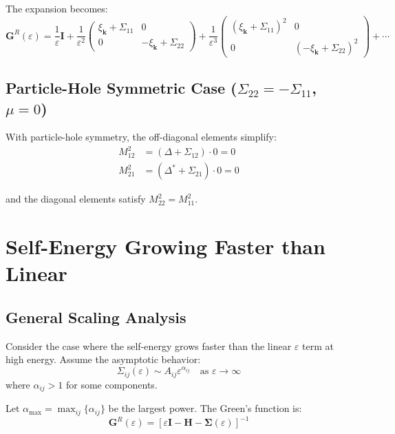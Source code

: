 \documentclass[12pt]{article}
\begin{document}
The expansion becomes:
\begin{equation}
\mathbf{G}^R(\varepsilon) = \frac{1}{\varepsilon}\mathbf{I} + \frac{1}{\varepsilon^2}\begin{pmatrix}
\xi_{\mathbf{k}} + \Sigma_{11} & 0 \\
0 & -\xi_{\mathbf{k}} + \Sigma_{22}
\end{pmatrix} + \frac{1}{\varepsilon^3}\begin{pmatrix}
(\xi_{\mathbf{k}} + \Sigma_{11})^2 & 0 \\
0 & (-\xi_{\mathbf{k}} + \Sigma_{22})^2
\end{pmatrix} + \cdots
\end{equation}

\subsection{Particle-Hole Symmetric Case ($\Sigma_{22} = -\Sigma_{11}$, $\mu = 0$)}

With particle-hole symmetry, the off-diagonal elements simplify:
\begin{align}
M^2_{12} &= (\Delta + \Sigma_{12}) \cdot 0 = 0 \\
M^2_{21} &= (\Delta^* + \Sigma_{21}) \cdot 0 = 0
\end{align}

and the diagonal elements satisfy $M^2_{22} = M^2_{11}$.

\section{Self-Energy Growing Faster than Linear}

\subsection{General Scaling Analysis}

Consider the case where the self-energy grows faster than the linear $\varepsilon$ term at high energy. Assume the asymptotic behavior:
\begin{equation}
\Sigma_{ij}(\varepsilon) \sim A_{ij} \varepsilon^{\alpha_{ij}} \quad \text{as } \varepsilon \to \infty
\end{equation}
where $\alpha_{ij} > 1$ for some components.

Let $\alpha_{\max} = \max_{ij}\{\alpha_{ij}\}$ be the largest power. The Green's function is:
\begin{equation}
\mathbf{G}^R(\varepsilon) = \left[\varepsilon \mathbf{I} - \mathbf{H} - \mathbf{\Sigma}(\varepsilon)\right]^{-1}
\end{equation}
\end{document}
